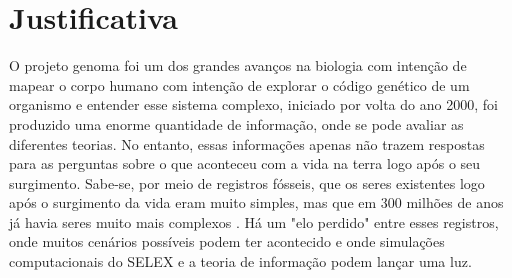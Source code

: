 \section{Justificativa}

O projeto genoma foi um dos grandes avanços na biologia com intenção de mapear o
corpo humano com intenção de explorar o código genético de um organismo e entender
esse sistema complexo, iniciado por volta do ano 2000, foi produzido uma enorme
quantidade de informação, onde se pode avaliar as diferentes teorias. No entanto, essas
informações apenas não trazem respostas para as perguntas sobre o que aconteceu com a
vida na terra logo após o seu surgimento. Sabe-se, por meio de registros fósseis, que os
seres existentes logo após o surgimento da vida eram muito simples, mas que em 300
milhões de anos já havia seres muito mais complexos \citep{1,2}. Há um "elo perdido" entre
esses registros, onde muitos cenários possíveis podem ter acontecido e onde simulações
computacionais do SELEX \citep{3} e a teoria de informação \citep{4,5} podem lançar uma luz.